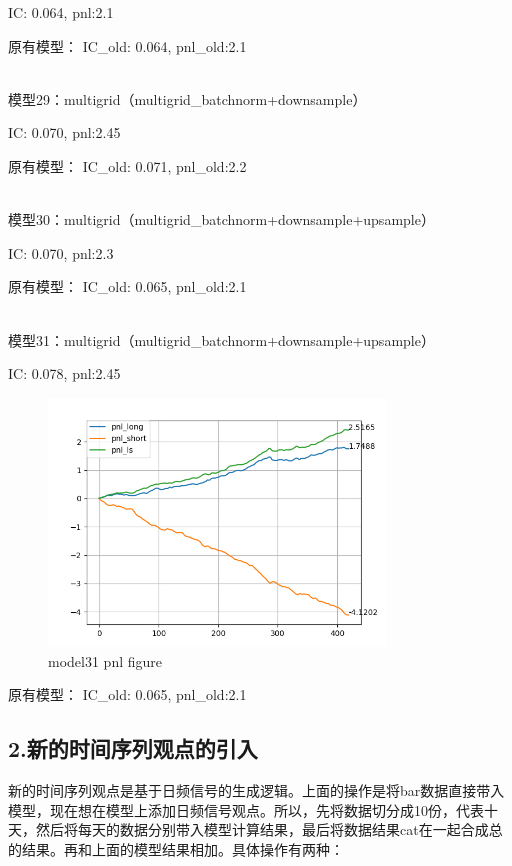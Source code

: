 \documentclass[11pt]{ctexart}
\begin{document}
{\kaishu \small IC: 0.064, pnl:2.1}

原有模型：
{\kaishu \small IC\_old: 0.064, pnl\_old:2.1}

~\\
模型29：multigrid（multigrid\_batchnorm+downsample）

{\kaishu \small IC: 0.070, pnl:2.45}

原有模型：
{\kaishu \small IC\_old: 0.071, pnl\_old:2.2}

~\\
模型30：multigrid（multigrid\_batchnorm+downsample+upsample）

{\kaishu \small IC: 0.070, pnl:2.3}

原有模型：
{\kaishu \small IC\_old: 0.065, pnl\_old:2.1}

~\\
模型31：multigrid（multigrid\_batchnorm+downsample+upsample）

{\kaishu \small IC: 0.078, pnl:2.45}

\begin{figure}[H]
\begin{center}
\includegraphics[width=0.8\textwidth]{plt2.PNG}
\end{center}
\caption{model31 pnl figure}
\label{FIG.1}
\end{figure}

原有模型：
{\kaishu \small IC\_old: 0.065, pnl\_old:2.1}

\subsection{2.新的时间序列观点的引入}
新的时间序列观点是基于日频信号的生成逻辑。上面的操作是将bar数据直接带入模型，现在想在模型上添加日频信号观点。所以，先将数据切分成10份，代表十天，然后将每天的数据分别带入模型计算结果，最后将数据结果cat在一起合成总的结果。再和上面的模型结果相加。具体操作有两种：
\end{document}
